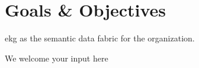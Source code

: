 \section{Goals \& Objectives}\label{sec:ekgmm-b-1-1} %

\gls{ekg} as the semantic data fabric for the organization.

We welcome your input here
